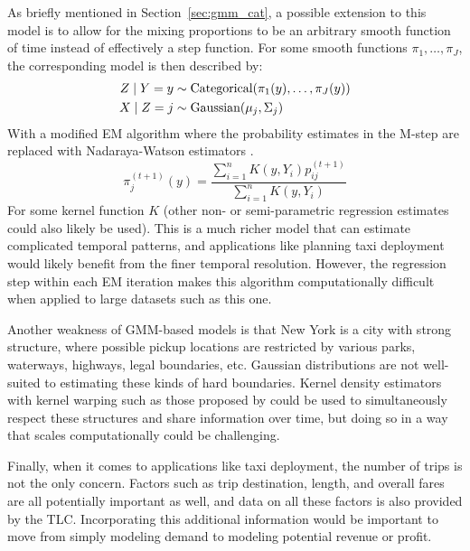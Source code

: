 \documentclass[12pt]{article}
\newcommand*{\cond}{\;\ifnum\currentgrouptype=16 \middle\fi|\;}
\newcommand*{\dist}{\sim}
\newcommand*{\mt}[1]{\text{\normalfont #1}}
\theoremstyle{definition}
\theoremstyle{algodesc}
\begin{document}
As briefly mentioned in Section~\ref{sec:gmm_cat}, a possible extension to this model is to allow for the mixing proportions to be an arbitrary smooth function of time instead of effectively a step function. For some smooth functions $\pi_1, \dots, \pi_J$, the corresponding model is then described by:
\begin{equation} \label{eq:gmm_smooth}
\begin{aligned}
Z \cond Y = y &\dist \mt{Categorical}(\pi_{1}(y), \dots, \pi_{J}(y)) \\
X \cond Z = j &\dist \mt{Gaussian}(\mu_j, \Sigma_j)
\end{aligned}
\end{equation}
With a modified EM algorithm where the probability estimates in the M-step are replaced with Nadaraya-Watson estimators \citep[as described in Chapter 6 of][]{esl}.
\begin{equation}
\pi^{(t+1)}_j(y) = \frac{\sum_{i=1}^n K(y, Y_i) p_{ij}^{(t+1)}}{\sum_{i=1}^n K(y, Y_i)}
\end{equation}
For some kernel function $K$ (other non- or semi-parametric regression estimates could also likely be used). This is a much richer model that can estimate complicated temporal patterns, and applications like planning taxi deployment would likely benefit from the finer temporal resolution. However, the regression step within each EM iteration makes this algorithm computationally difficult when applied to large datasets such as this one.

Another weakness of GMM-based models is that New York is a city with strong structure, where possible pickup locations are restricted by various parks, waterways, highways, legal boundaries, etc. Gaussian distributions are not well-suited to estimating these kinds of hard boundaries. Kernel density estimators with kernel warping such as those proposed by \citet{zhoumatteson} could be used to simultaneously respect these structures and share information over time, but doing so in a way that scales computationally could be challenging.

Finally, when it comes to applications like taxi deployment, the number of trips is not the only concern. Factors such as trip destination, length, and overall fares are all potentially important as well, and data on all these factors is also provided by the TLC. Incorporating this additional information would be important to move from simply modeling demand to modeling potential revenue or profit.




\end{document}
